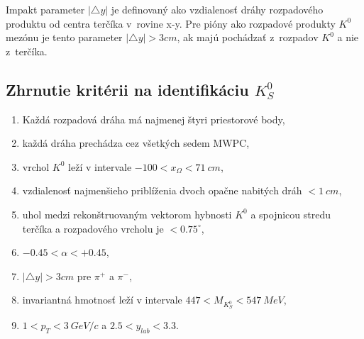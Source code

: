 Impakt parameter $|\triangle y|$ je definovaný ako vzdialenosť dráhy
rozpadového produktu od centra terčíka v~rovine x-y. Pre pióny ako rozpadové
produkty $K^{0}$ mezónu je tento parameter $|\triangle y|>3cm$, ak majú
pochádzať z~rozpadov $K^{0}$ a nie z~terčíka.

\subsection{Zhrnutie kritérii na identifikáciu $K^{0}_{S}$}
\begin{enumerate}
\item{Každá rozpadová dráha má najmenej štyri priestorové body,}
\item{každá dráha prechádza cez všetkých sedem MWPC,}
\item{vrchol $K^{0}$ leží v intervale $-100<x_{\Omega}<71\: cm$,}
\item{vzdialenosť najmenšieho priblíženia dvoch opačne nabitých
  dráh
  $<1\: cm$,}
\item{uhol medzi rekonštruovaným  vektorom hybnosti $K^{0}$ a spojnicou
  stredu terčíka a
  rozpadového vrcholu je  $<0.75^{\circ}$,}
\item{$ -0.45< \alpha <+0.45$,}
\item{$|\triangle y|>3cm$ pre $\pi^{+}$ a $\pi^{-}$,}
\item{invariantná hmotnosť leží v intervale $447 < M_{K^{0}_{S}} < 547\:
  MeV$,}
\item{$1<p_{T}<3\: GeV/c$ a $2.5<y_{lab}<3.3$.}
\end{enumerate}

